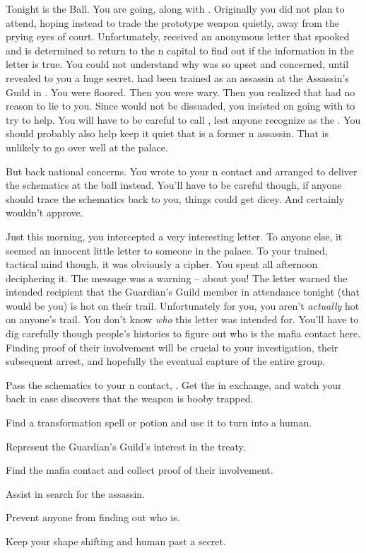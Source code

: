 \documentclass[char]{NeptuneBall}
\begin{document}
Tonight is the \cExExKing{} Ball. You are going, along with \cQueen{}. Originally you did not plan to attend, hoping instead to trade  the prototype weapon quietly, away from the prying eyes of court. Unfortunately, \cQueen{} received an anonymous letter that spooked \cQueen{\them} and \cQueen{\they} is determined to return to the \pAtlantis{}n capital to find out if the information in the letter is true. You could not understand why \cQueen{} was so upset and concerned, until \cQueen{\they} revealed to you a huge secret. \cQueen{} had been trained as an assassin at the Assassin's Guild in \pPacifica{}. You were floored. Then you were wary. Then you realized that \cQueen{} had no reason to lie to you. Since \cQueen{\they} would not be dissuaded, you insisted on going with \cQueen{\them} to try to help. You will have to be careful to call \cQueen{\them} \cQueen{\MYname}, lest anyone recognize \cQueen{\them} as the \cQueen{\King}. You should probably also help keep it quiet that  is a former \pPacifica{}n assassin. That is unlikely to go over well at the palace.

But back national concerns. You wrote to your \pPacifica{}n contact and arranged to deliver the schematics at the ball instead. You'll have to be careful though, if anyone should trace the schematics back to you, things could get dicey. And \cQueen{} certainly wouldn't approve.

Just this morning, you intercepted a very interesting letter. To anyone else, it seemed an innocent little letter to someone in the palace. To your trained, tactical mind though, it was obviously a cipher. You spent all afternoon deciphering it. The message was a warning -- about you! The letter warned the intended recipient that the Guardian's Guild member in attendance tonight (that would be you) is hot on their trail. Unfortunately for you, you aren't \emph{actually} hot on anyone's trail. You don't know \emph{who} this letter was intended for. You'll have to dig carefully though people's histories to figure out who is the mafia contact here. Finding proof of their involvement will be crucial to your investigation, their subsequent arrest, and hopefully the eventual capture of the entire group.


\begin{itemz}[Goals]
  \item Pass the schematics to your \pPacifica{}n contact, \cSpy{}. Get the \iBattlePlan{} in exchange, and watch your back in case \cSpy{\they} discovers that the weapon is booby trapped.
  \item Find a transformation spell or potion and use it to turn \cQueen{} into a human.
  \item Represent the Guardian's Guild's interest in the treaty.
  \item Find the mafia contact and collect proof of their involvement.
  \item Assist \cQueen{} in \cQueen{\their} search for the assassin.
  \item Prevent anyone from finding out who \cQueen{} is.
  \item Keep your shape shifting and human past a secret.
\end{itemz}
\end{document}
